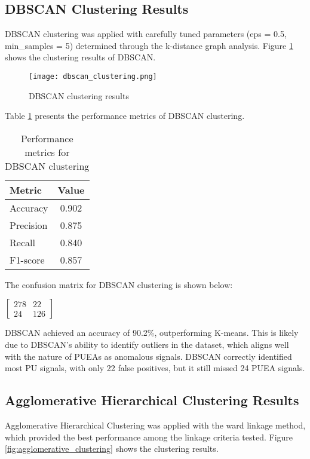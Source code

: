 \subsection{DBSCAN Clustering Results}
DBSCAN clustering was applied with carefully tuned parameters (eps = 0.5, min\_samples = 5) determined through the k-distance graph analysis. Figure \ref{fig:dbscan_clustering} shows the clustering results of DBSCAN.

\begin{figure}[h]
    \centering
    \texttt{[image: dbscan\_clustering.png]}
    \caption{DBSCAN clustering results}
    \label{fig:dbscan_clustering}
\end{figure}

Table \ref{tab:dbscan_performance} presents the performance metrics of DBSCAN clustering.

\begin{table}[h]
    \centering
    \caption{Performance metrics for DBSCAN clustering}
    \label{tab:dbscan_performance}
    \begin{tabular}{lc}
        \toprule
        Metric & Value \\
        \midrule
        Accuracy & 0.902 \\
        Precision & 0.875 \\
        Recall & 0.840 \\
        F1-score & 0.857 \\
        \bottomrule
    \end{tabular}
\end{table}

The confusion matrix for DBSCAN clustering is shown below:
\begin{center}
$\begin{bmatrix}
278 & 22 \\
24 & 126
\end{bmatrix}$
\end{center}

DBSCAN achieved an accuracy of 90.2\%, outperforming K-means. This is likely due to DBSCAN's ability to identify outliers in the dataset, which aligns well with the nature of PUEAs as anomalous signals. DBSCAN correctly identified most PU signals, with only 22 false positives, but it still missed 24 PUEA signals.

\subsection{Agglomerative Hierarchical Clustering Results}
Agglomerative Hierarchical Clustering was applied with the ward linkage method, which provided the best performance among the linkage criteria tested. Figure \ref{fig:agglomerative_clustering} shows the clustering results.

